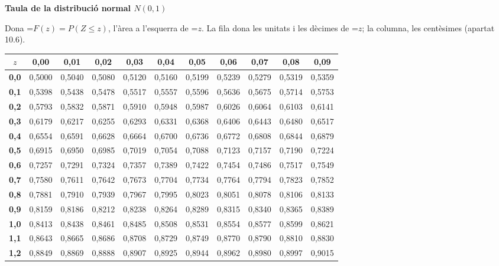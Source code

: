 \documentclass[11pt,a4paper]{article}
\newcommand{\fmm}[1]{\setbox0=\hbox{$#1$}\ifdim\wd0>\linewidth\[#1\]\else\mbox{\box0}\fi}
\begin{document}
\clearpage
\label{tnorm}{\color{fmgreen}\large\bfseries Taula de la distribució normal $N(0,1)$}\par\smallskip
Dona \fmm{F(z)=P(Z\leq z)}, l'àrea a l'esquerra de \fmm{z}. La fila dona les unitats i les dècimes de \fmm{z}; la columna, les centèsimes (apartat 10.6).\par\smallskip
\begin{center}\linespread{1}\selectfont\small\setlength{\tabcolsep}{6pt}\renewcommand{\arraystretch}{1.08}
\begin{tabular}{c|cccccccccc}\toprule
$z$ & \textbf{0,00} & \textbf{0,01} & \textbf{0,02} & \textbf{0,03} & \textbf{0,04} & \textbf{0,05} & \textbf{0,06} & \textbf{0,07} & \textbf{0,08} & \textbf{0,09}\\\midrule
\textbf{0,0} & 0,5000 & 0,5040 & 0,5080 & 0,5120 & 0,5160 & 0,5199 & 0,5239 & 0,5279 & 0,5319 & 0,5359\\
\textbf{0,1} & 0,5398 & 0,5438 & 0,5478 & 0,5517 & 0,5557 & 0,5596 & 0,5636 & 0,5675 & 0,5714 & 0,5753\\
\textbf{0,2} & 0,5793 & 0,5832 & 0,5871 & 0,5910 & 0,5948 & 0,5987 & 0,6026 & 0,6064 & 0,6103 & 0,6141\\
\textbf{0,3} & 0,6179 & 0,6217 & 0,6255 & 0,6293 & 0,6331 & 0,6368 & 0,6406 & 0,6443 & 0,6480 & 0,6517\\
\textbf{0,4} & 0,6554 & 0,6591 & 0,6628 & 0,6664 & 0,6700 & 0,6736 & 0,6772 & 0,6808 & 0,6844 & 0,6879\\[2pt]
\textbf{0,5} & 0,6915 & 0,6950 & 0,6985 & 0,7019 & 0,7054 & 0,7088 & 0,7123 & 0,7157 & 0,7190 & 0,7224\\
\textbf{0,6} & 0,7257 & 0,7291 & 0,7324 & 0,7357 & 0,7389 & 0,7422 & 0,7454 & 0,7486 & 0,7517 & 0,7549\\
\textbf{0,7} & 0,7580 & 0,7611 & 0,7642 & 0,7673 & 0,7704 & 0,7734 & 0,7764 & 0,7794 & 0,7823 & 0,7852\\
\textbf{0,8} & 0,7881 & 0,7910 & 0,7939 & 0,7967 & 0,7995 & 0,8023 & 0,8051 & 0,8078 & 0,8106 & 0,8133\\
\textbf{0,9} & 0,8159 & 0,8186 & 0,8212 & 0,8238 & 0,8264 & 0,8289 & 0,8315 & 0,8340 & 0,8365 & 0,8389\\[2pt]
\textbf{1,0} & 0,8413 & 0,8438 & 0,8461 & 0,8485 & 0,8508 & 0,8531 & 0,8554 & 0,8577 & 0,8599 & 0,8621\\
\textbf{1,1} & 0,8643 & 0,8665 & 0,8686 & 0,8708 & 0,8729 & 0,8749 & 0,8770 & 0,8790 & 0,8810 & 0,8830\\
\textbf{1,2} & 0,8849 & 0,8869 & 0,8888 & 0,8907 & 0,8925 & 0,8944 & 0,8962 & 0,8980 & 0,8997 & 0,9015\\

\end{tabular}
\end{center}
\end{document}
